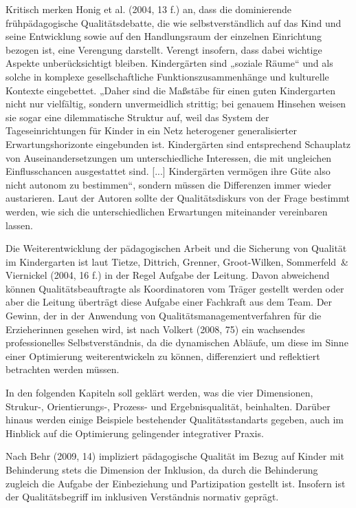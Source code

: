 Kritisch merken Honig et al. (2004, 13 f.) an, dass die dominierende frühpädagogische Qualitätsdebatte, die wie selbstverständlich auf das Kind und seine Entwicklung sowie auf den Handlungsraum der einzelnen Einrichtung bezogen ist, eine Verengung darstellt. Verengt insofern, dass dabei wichtige Aspekte unberücksichtigt bleiben. Kindergärten sind „soziale Räume“ und als solche in komplexe gesellschaftliche Funktionszusammenhänge und kulturelle Kontexte eingebettet. „Daher sind die Maßstäbe für einen guten Kindergarten nicht nur vielfältig, sondern unvermeidlich strittig; bei genauem Hinsehen weisen sie sogar eine dilemmatische Struktur auf, weil das System der Tageseinrichtungen für Kinder in ein Netz heterogener generalisierter Erwartungshorizonte eingebunden ist. Kindergärten sind entsprechend Schauplatz von Auseinandersetzungen um unterschiedliche Interessen, die mit ungleichen Einflusschancen ausgestattet sind. [...] Kindergärten vermögen ihre Güte also nicht autonom zu bestimmen“, sondern müssen die Differenzen immer wieder austarieren. 
Laut der Autoren sollte der Qualitätsdiskurs von der Frage bestimmt werden, wie sich die unterschiedlichen Erwartungen miteinander vereinbaren lassen.

Die Weiterentwicklung der pädagogischen Arbeit und die Sicherung von Qualität im Kindergarten ist laut Tietze, Dittrich, Grenner, Groot-Wilken, Sommerfeld~\& Viernickel (2004, 16 f.) in der Regel Aufgabe der Leitung. Davon abweichend können Qualitätsbeauftragte als Koordinatoren vom Träger gestellt werden oder aber die Leitung überträgt diese Aufgabe einer Fachkraft aus dem Team. 
Der Gewinn, der in der Anwendung von Qualitätsmanagementverfahren für die Erzieherinnen gesehen wird, ist nach Volkert (2008, 75) ein  wachsendes professionelles Selbstverständnis, da die dynamischen Abläufe, um diese im Sinne einer Optimierung weiterentwickeln zu können, differenziert und reflektiert betrachten werden müssen.

In den folgenden Kapiteln soll geklärt werden, was die vier Dimensionen, Strukur-, Orientierungs-, Prozess- und Ergebnisqualität, beinhalten. Darüber hinaus werden einige Beispiele bestehender Qualitätsstandarts gegeben, auch im Hinblick auf die Optimierung gelingender integrativer Praxis. 

Nach Behr (2009, 14) impliziert pädagogische Qualität im Bezug auf Kinder mit Behinderung stets die Dimension der Inklusion, da durch die Behinderung zugleich die Aufgabe der Einbeziehung und Partizipation gestellt ist. Insofern ist der Qualitätsbegriff im inklusiven Verständnis normativ geprägt. 

